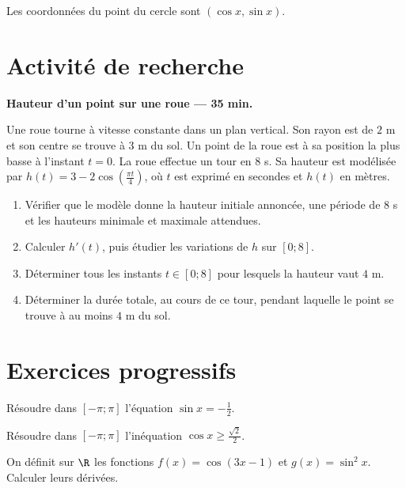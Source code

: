\begin{center}\par\small Les coordonnées du point du cercle sont $(\cos x,\sin x)$.\end{center}

\section{Activité de recherche}\textbf{Hauteur d'un point sur une roue --- 35 min.}\par Une roue tourne à vitesse constante dans un plan vertical. Son rayon est de $2$ m et son centre se trouve à $3$ m du sol. Un point de la roue est à sa position la plus basse à l'instant $t=0$. La roue effectue un tour en $8$ s. Sa hauteur est modélisée par $h(t)=3-2\cos\left(\frac{\pi t}{4}\right)$, où $t$ est exprimé en secondes et $h(t)$ en mètres.
\begin{enumerate}\item Vérifier que le modèle donne la hauteur initiale annoncée, une période de $8$ s et les hauteurs minimale et maximale attendues.
\item Calculer $h' (t)$, puis étudier les variations de $h$ sur $[0;8]$.
\item Déterminer tous les instants $t\in[0;8]$ pour lesquels la hauteur vaut $4$ m.
\item Déterminer la durée totale, au cours de ce tour, pendant laquelle le point se trouve à au moins $4$ m du sol.\end{enumerate}

\section{Exercices progressifs}

Résoudre dans $[-\pi;\pi]$ l'équation $\sin x=-\frac12$.

Résoudre dans $[-\pi;\pi]$ l'inéquation $\cos x\ge\frac{\sqrt2}{2}$.

On définit sur $\R$ les fonctions $f(x)=\cos(3x-1)$ et $g(x)=\sin^2x$. Calculer leurs dérivées.

